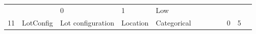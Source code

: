 \documentclass[11pt]{article}
\begin{document}
\begin{longtable}[]{@{}llllllllllll@{}}
\begin{minipage}[t]{0.04\columnwidth}
\strut
\end{minipage} & \begin{minipage}[t]{0.04\columnwidth}\raggedright\strut
\strut
\end{minipage} & \begin{minipage}[t]{0.04\columnwidth}\raggedright\strut
0\strut
\end{minipage} & \begin{minipage}[t]{0.04\columnwidth}\raggedright\strut
1\strut
\end{minipage} & \begin{minipage}[t]{0.04\columnwidth}\raggedright\strut
Low\strut
\end{minipage}\tabularnewline
\begin{minipage}[t]{0.04\columnwidth}\raggedright\strut
11\strut
\end{minipage} & \begin{minipage}[t]{0.04\columnwidth}\raggedright\strut
LotConfig\strut
\end{minipage} & \begin{minipage}[t]{0.04\columnwidth}\raggedright\strut
Lot configuration\strut
\end{minipage} & \begin{minipage}[t]{0.04\columnwidth}\raggedright\strut
Location\strut
\end{minipage} & \begin{minipage}[t]{0.04\columnwidth}\raggedright\strut
Categorical\strut
\end{minipage} & \begin{minipage}[t]{0.04\columnwidth}\raggedright\strut
\strut
\end{minipage} & \begin{minipage}[t]{0.04\columnwidth}\raggedright\strut
\strut
\end{minipage} & \begin{minipage}[t]{0.04\columnwidth}\raggedright\strut
\strut
\end{minipage} & \begin{minipage}[t]{0.04\columnwidth}\raggedright\strut
\strut
\end{minipage} & \begin{minipage}[t]{0.04\columnwidth}\raggedright\strut
0\strut
\end{minipage} & \begin{minipage}[t]{0.04\columnwidth}\raggedright\strut
5\strut
\end{minipage} & \begin{minipage}[t]{0.04\columnwidth}\raggedright\strut

\end{minipage}
\end{longtable}
\end{document}

